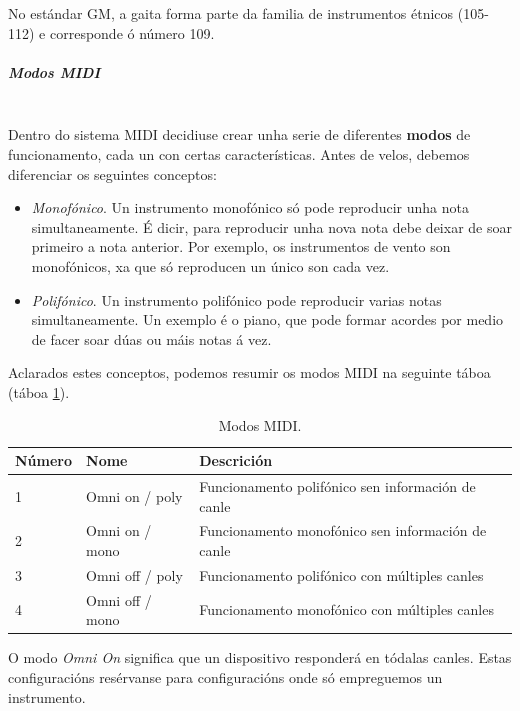     No estándar GM, a gaita forma parte da familia de instrumentos étnicos
    (105-112) e corresponde ó número 109.

    \subparagraph{Modos MIDI}\mbox{}\\

    Dentro do sistema MIDI decidiuse crear unha serie de diferentes
    \textbf{modos} de funcionamento, cada un con certas características. Antes
    de velos, debemos diferenciar os seguintes conceptos:

    \begin{itemize}
     \item \textit{Monofónico}. Un instrumento monofónico só pode reproducir
           unha nota simultaneamente. É dicir, para reproducir unha nova nota
           debe deixar de soar primeiro a nota anterior. Por exemplo, os
           instrumentos de vento son monofónicos, xa que só reproducen un único
           son cada vez.
     \item \textit{Polifónico}. Un instrumento polifónico pode reproducir
           varias notas simultaneamente. Un exemplo é o piano, que pode formar
           acordes por medio de facer soar dúas ou máis notas á vez.
    \end{itemize}

    Aclarados estes conceptos, podemos resumir os modos MIDI na seguinte táboa
    (táboa \ref{tabla:WikipediaModosMIDI}). \\

    \begin{table}[htbp]
     \centering
     \begin{tabular}{|l|l|l|}
      \hline
      \textbf{Número} & \textbf{Nome} & \textbf{Descrición} \\
      \hline
      1 & Omni on / poly & Funcionamento polifónico sen información de canle \\
      \hline
      2 & Omni on / mono & Funcionamento monofónico sen información de canle \\
      \hline
      3 & Omni off / poly & Funcionamento polifónico con múltiples canles \\
      \hline
      4 & Omni off / mono & Funcionamento monofónico con múltiples canles \\
      \hline
     \end{tabular}
     \caption{Modos MIDI.}
     \label{tabla:WikipediaModosMIDI}  
    \end{table}

    O modo \textit{Omni On} significa que un dispositivo responderá en tódalas
    canles. Estas configuracións resérvanse para configuracións onde só
    empreguemos un instrumento. \\

